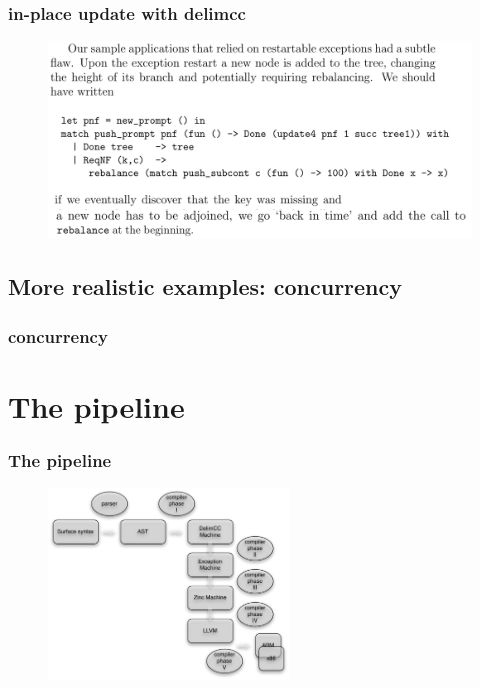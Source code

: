 \documentclass{beamer}
\begin{document}
  \begin{frame}
    \frametitle{in-place update with delimcc}    
    \begin{figure}[ht]
      \begin{center}        
        \includegraphics[width=\textwidth,height=0.7\textheight,keepaspectratio]{pipelinefigures/InplaceUpdateElaboration.pdf}
      \end{center}      
    \end{figure}
  \end{frame}
  \subsection{More realistic examples: concurrency}
  \begin{frame}
    \frametitle{concurrency}    
  \end{frame}
  \section{The pipeline}
  \begin{frame}
    \frametitle{The pipeline}
    \begin{figure}[ht]
      \begin{center}        
        \includegraphics[height=2in]{pipelinefigures/PipelineImageI.pdf}
      \end{center}      
    \end{figure}
  \end{frame}
\end{document}
